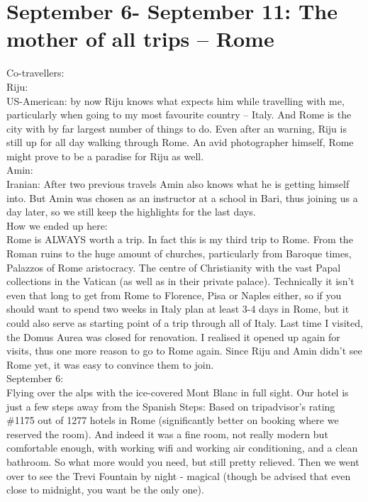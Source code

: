 \section{September 6- September 11: The mother of all trips -- Rome}
\label{2017:Rome}

Co-travellers:\\
Riju:\\
US-American: by now Riju knows what expects him while travelling with me, particularly when going to my most favourite country -- Italy. And Rome is the city with by far largest number of things to do. Even after an warning, Riju is still up for all day walking through Rome. An avid photographer himself, Rome might prove to be a paradise for Riju as well.\\

Amin:\\
Iranian: After two previous travels Amin also knows what he is getting himself into. But Amin was chosen as an instructor at a school in Bari, thus joining us a day later, so we still keep the highlights for the last days.\\

How we ended up here:\\
Rome is ALWAYS worth a trip. In fact this is my third trip to Rome. From the Roman ruins to the huge amount of churches, particularly from Baroque times, Palazzos of Rome aristocracy. The centre of Christianity with the vast Papal collections in the Vatican (as well as in their private palace). Technically it isn't even that long to get from Rome to Florence, Pisa or Naples either, so if you should want to spend two weeks in Italy plan at least 3-4 days in Rome, but it could also serve as starting point of a trip through all of Italy. Last time I visited, the Domus Aurea was closed for renovation. I realised it opened up again for visits, thus one more reason to go to Rome again. Since Riju and Amin didn't see Rome yet, it was easy to convince them to join.\\

September 6:\\
Flying over the alps with the ice-covered Mont Blanc in full sight. Our hotel is just a few steps away from the Spanish Steps: Based on tripadvisor's rating \#1175 out of 1277 hotels in Rome (significantly better on booking where we reserved the room). And indeed it was a fine room, not really modern but comfortable enough, with working wifi and working air conditioning, and a clean bathroom. So what more would you need, but still pretty relieved. Then we went over to see the Trevi Fountain by night - magical (though be advised that even close to midnight, you want be the only one).\\

